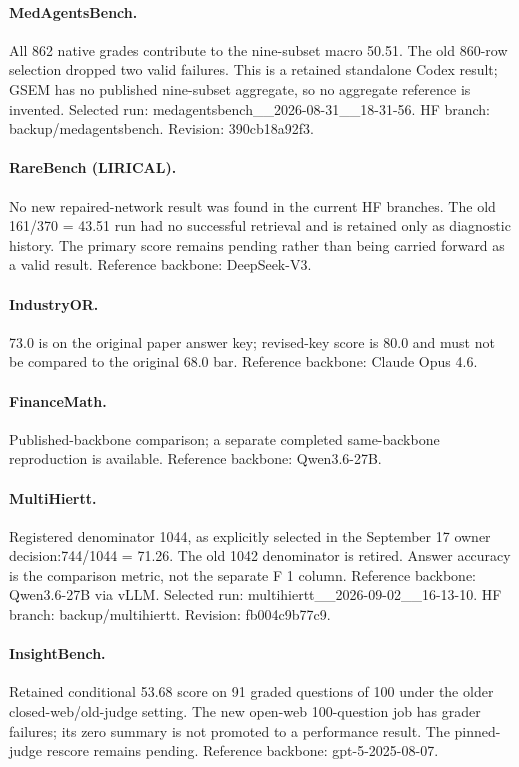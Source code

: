 \paragraph{MedAgentsBench.} All 862 native grades contribute to the nine-subset macro 50.51. The old 860-row selection dropped two valid failures. This is a retained standalone Codex result; GSEM has no published nine-subset aggregate, so no aggregate reference is invented. Selected run: medagentsbench\_\_2026-08-31\_\_18-31-56. HF branch: backup/medagentsbench. Revision: 390cb18a92f3.
\paragraph{RareBench (LIRICAL).} No new repaired-network result was found in the current HF branches. The old 161/370 = 43.51 run had no successful retrieval and is retained only as diagnostic history. The primary score remains pending rather than being carried forward as a valid result. Reference backbone: DeepSeek-V3.
\paragraph{IndustryOR.} 73.0 is on the original paper answer key; revised-key score is 80.0 and must not be compared to the original 68.0 bar. Reference backbone: Claude Opus 4.6.
\paragraph{FinanceMath.} Published-backbone comparison; a separate completed same-backbone reproduction is available. Reference backbone: Qwen3.6-27B.
\paragraph{MultiHiertt.} Registered denominator 1044, as explicitly selected in the September 17 owner decision:744/1044 = 71.26. The old 1042 denominator is retired. Answer accuracy is the comparison metric, not the separate F 1 column. Reference backbone: Qwen3.6-27B via vLLM. Selected run: multihiertt\_\_2026-09-02\_\_16-13-10. HF branch: backup/multihiertt. Revision: fb004c9b77c9.
\paragraph{InsightBench.} Retained conditional 53.68 score on 91 graded questions of 100 under the older closed-web/old-judge setting. The new open-web 100-question job has grader failures; its zero summary is not promoted to a performance result. The pinned-judge rescore remains pending. Reference backbone: gpt-5-2025-08-07.
